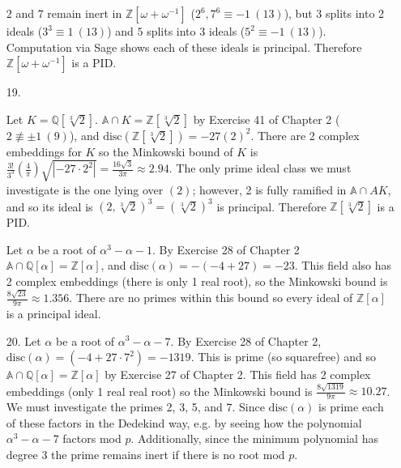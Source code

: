 \documentclass{article}
\newcommand{\w}[0]{\omega}
\newcommand{\Q}[0]{\mathbb{Q}}
\newcommand{\Z}[0]{\mathbb{Z}}
\newcommand{\disc}[1]{\text{disc}(#1)}
\newcommand{\modequiv}[3]{#1 \equiv #2\ (#3)}
\newcommand{\modnotequiv}[3]{#1 \not\equiv #2\ (#3)}
\newcommand{\ringofintegers}[1]{\mathbb{A} \cap #1}
\begin{document}
\begin{enumerate}
    $2$ and $7$ remain inert in $\Z[\w + \w^{-1}]$ ($\modequiv{2^6, 7^6}{-1}{13}$), but $3$ splits into 2 ideals ($\modequiv{3^3}{1}{13}$) and $5$ splits into 3 ideals ($\modequiv{5^2}{-1}{13}$).  Computation via Sage shows each of these ideals is principal.  Therefore $\Z[\w + \w^{-1}]$ is a PID.

    \item [19.]

    Let $K = \Q[\sqrt[3]{2}]$.  $\ringofintegers{K} = \Z[\sqrt[3]{2}]$ by Exercise 41 of Chapter 2 ($\modnotequiv{2}{\pm 1}{9}$), and $\disc{\Z[\sqrt[3]{2}]} = -27(2)^2$.  There are 2 complex embeddings for $K$ so the Minkowski bound of $K$ is $\frac{3!}{3^3}\left(\frac{4}{\pi}\right)\sqrt{|-27 \cdot 2^2|} = \frac{16\sqrt{3}}{3\pi} \approx 2.94$.  The only prime ideal class we must investigate is the one lying over $(2)$; however, 2 is fully ramified in $\ringofintegers{A}{K}$, and so its ideal is $(2, \sqrt[3]{2})^3 = (\sqrt[3]{2})^3$ is principal.  Therefore $\Z[\sqrt[3]{2}]$ is a PID.

    Let $\alpha$ be a root of $\alpha^3 - \alpha - 1$.  By Exercise 28 of Chapter 2 $\ringofintegers{\Q[\alpha]} = \Z[\alpha]$, and $\disc{\alpha} = -(-4 + 27) = -23$.  This field also has 2 complex embeddings (there is only 1 real root), so the Minkowski bound is $\frac{8\sqrt{23}}{9\pi} \approx 1.356$.  There are no primes within this bound so every ideal of $\Z[\alpha]$ is a principal ideal.

    \item [20.] Let $\alpha$ be a root of $\alpha^3 - \alpha - 7$.  By Exercise 28 of Chapter 2, $\disc{\alpha} = (-4 + 27 \cdot 7^2) = -1319$.  This is prime (so squarefree) and so $\ringofintegers{\Q[\alpha]} = \Z[\alpha]$ by Exercise 27 of Chapter 2.  This field has 2 complex embeddings (only 1 real real root) so the Minkowski bound is $\frac{8\sqrt{1319}}{9\pi} \approx 10.27$.  We must investigate the primes 2, 3, 5, and 7.  Since $\disc{\alpha}$ is prime each of these factors in the Dedekind way, e.g. by seeing how the polynomial $\alpha^3 - \alpha - 7$ factors mod $p$.  Additionally, since the minimum polynomial has degree 3 the prime remains inert if there is no root mod $p$.


\end{enumerate}
\end{document}
